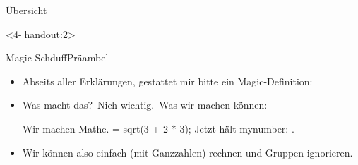 \begin{frame}[c,fragile]{Übersicht}

\begin{onlyenv}<4-|handout:2>
\begin{center}
    \begin{minipage}{.45\linewidth}
\end{minipage}
\end{center}
\end{onlyenv}
\end{frame}

\begin{frame}[c,fragile]{Magic Schduff\hfill Präambel}
\begin{itemize}[<+(1)->]
    \item Abseits aller Erklärungen, gestattet mir bitte ein Magic-Definition:\pause
{}
    \item Was macht das?\pause\ Nich wichtig.\pause\ Was wir machen können:
\begin{sclatex}[morekeywords={[5]{\\calc,\\mynumber}}]
Wir machen Mathe.
\calc \mynumber = sqrt(3 + 2 * 3);
Jetzt hält mynumber: \mynumber.
\end{sclatex}
    \item Wir können also einfach (mit Ganzzahlen) rechnen und Gruppen ignorieren.
\end{itemize}
\end{frame}


